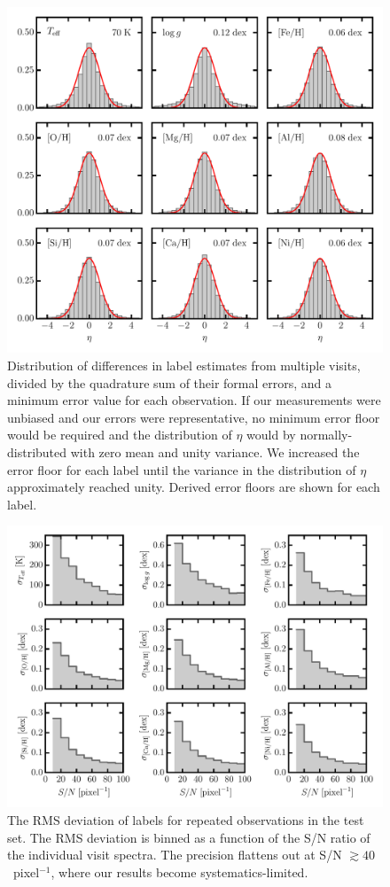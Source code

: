 \documentclass[preprint]{aastex}
\begin{document}
\begin{figure}[p]
\includegraphics[width=\textwidth]{figures/pairwise-metrics.pdf}
\caption{Distribution of differences in label estimates from multiple visits, divided by the quadrature sum of their formal errors, and a minimum error value for each observation.  If our measurements were unbiased and our errors were representative, no minimum error floor would be required and the distribution of $\eta$ would by normally-distributed with zero mean and unity variance. 
We increased the error floor for each label until the variance in the distribution of $\eta$ approximately reached unity. Derived error floors are shown for each label.\label{fig:pairwise-comparison}}
\end{figure}


\begin{figure}[p]
\includegraphics[width=\textwidth]{figures/repeat-visits.pdf}
\caption{The RMS deviation of labels for repeated observations in the test set.  The RMS deviation is binned as a function of the S/N ratio of the individual visit spectra.  The
precision flattens out at S/N $\gtrsim 40$~pixel$^{-1}$, where our results become systematics-limited.
\label{fig:repeat-visits}}
\end{figure}
\end{document}
